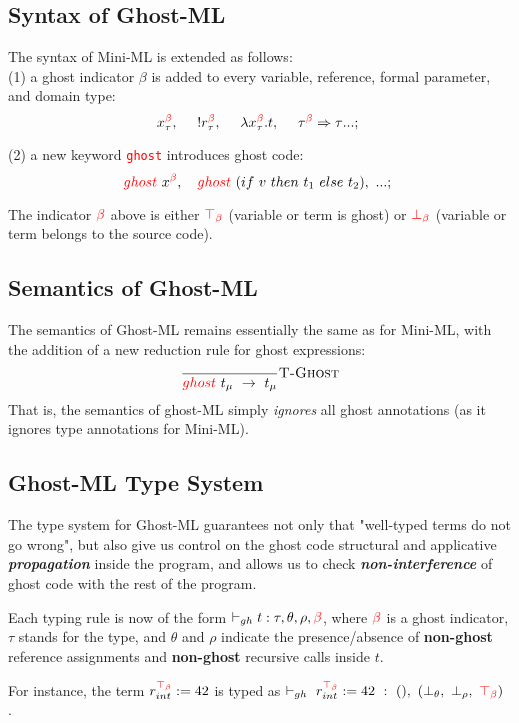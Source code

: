 \documentclass[a4paper,11pt,oneside]{article}
\theoremstyle{plain}
\newcommand{\rouge}[1]{\textcolor{red}{#1}}
\newcommand{\ghosttyping}[6]{\vdash_{gh}~#1~:~#2,~(#3,~#4,~\rouge{#5})~\textcolor{blue}{\boldsymbol{#6}}}
\newcommand{\bth}{\bot_\theta}
\newcommand{\brh}{\bot_\rho}
\newcommand{\gb}{\beta}
\newcommand{\gbb}{\bot_\beta}
\newcommand{\gbt}{\top_\beta}
\newcommand{\gbr}{\textcolor{red}{\gb}}
\newcommand{\gbbr}{\textcolor{red}{\gbb}}
\newcommand{\gbtr}{\textcolor{red}{\gbt}}
\begin{document}
\subsection{Syntax of Ghost-ML}
The syntax of Mini-ML is extended as follows: \\

(1) a ghost indicator $\beta$ is added to every variable, reference,  formal parameter, and domain type: 
$$x_\tau^{\rouge{\beta}},~ \quad !r^{\rouge{\beta}}_{\tau},~ \quad \lambda x_\tau^{\rouge{\beta}}. t,~ \quad {\tau^{\rouge{\beta}} \Rightarrow \tau}...;~$$

(2) a new keyword \texttt{\rouge{ghost}} introduces ghost code: 
$$\rouge{ghost}~x^{\rouge{\beta}},~~~\rouge{ghost}~(if~v~ then~ t_1~ else~ t_2),~ ...;~$$

The indicator $\gbr$ above is either $\gbtr$ (variable or term is ghost) or $\gbbr$ (variable or term belongs to the source code).

\subsection{Semantics of Ghost-ML}

The semantics of Ghost-ML remains essentially the same as for Mini-ML,
with the addition of a new reduction rule for ghost expressions:
$$\dfrac{}{\rouge{ghost}~ t_\mu~ \rightarrow~ t_\mu}{\textsc{T-Ghost}}$$
That is, the semantics of ghost-ML simply \textit{ignores} all ghost annotations (as it ignores type annotations for Mini-ML).


\subsection{Ghost-ML Type System}

The type system for Ghost-ML guarantees not only that "well-typed terms do not go wrong", but also give us control on the ghost code structural and applicative \textbf{\textit{propagation}} inside the program, and allows us to check  \textbf{\textit{non-interference}} of ghost code with the rest of the program.   

	Each typing rule is now of the form $\vdash_{gh} t : \tau,
        \theta, \rho, \rouge{\beta}$, where $\rouge{\beta}$ is a ghost indicator, $\tau$ stands for the type, and $\theta$ and $\rho$ indicate  the presence/absence of \textbf{non-ghost} reference assignments and \textbf{non-ghost} recursive calls inside $t$.

For instance, the term $r_{int}^{\gbtr} := 42 $ is typed as
$\ghosttyping{r_{int}^{\gbtr} := 42}{()}{\bth}{\brh}{\gbtr}{}$.
\end{document}
